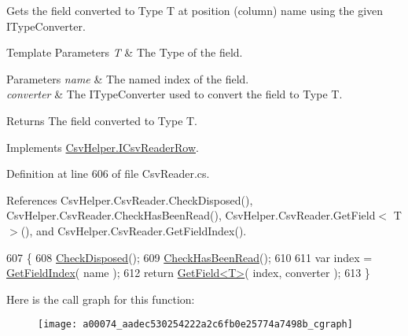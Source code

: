 Gets the field converted to Type T at position (column) name using the given I\-Type\-Converter. 


\begin{DoxyTemplParams}{Template Parameters}
{\em T} & The Type of the field.\\
\hline
\end{DoxyTemplParams}

\begin{DoxyParams}{Parameters}
{\em name} & The named index of the field.\\
\hline
{\em converter} & The I\-Type\-Converter used to convert the field to Type T.\\
\hline
\end{DoxyParams}
\begin{DoxyReturn}{Returns}
The field converted to Type T.
\end{DoxyReturn}


Implements \hyperlink{a00110_a640689c76826aafd8c79ff71d4f0992d}{Csv\-Helper.\-I\-Csv\-Reader\-Row}.



Definition at line 606 of file Csv\-Reader.\-cs.



References Csv\-Helper.\-Csv\-Reader.\-Check\-Disposed(), Csv\-Helper.\-Csv\-Reader.\-Check\-Has\-Been\-Read(), Csv\-Helper.\-Csv\-Reader.\-Get\-Field$<$ T $>$(), and Csv\-Helper.\-Csv\-Reader.\-Get\-Field\-Index().


\begin{DoxyCode}
607         \{
608             \hyperlink{a00074_a6fa45a46ed1322dc1872ca2321b5edbc}{CheckDisposed}();
609             \hyperlink{a00074_a2d9249171ed1568e45d152766d364c31}{CheckHasBeenRead}();
610 
611             var index = \hyperlink{a00074_a7e507d40e35fde7bf23e208be7be0884}{GetFieldIndex}( name );
612             \textcolor{keywordflow}{return} \hyperlink{a00074_a6a43cfaf39caea93ecd87e506be7b404}{GetField<T>}( index, converter );
613         \}
\end{DoxyCode}


Here is the call graph for this function\-:
\nopagebreak
\begin{figure}[H]
\begin{center}
\leavevmode
\texttt{[image: a00074\_aadec530254222a2c6fb0e25774a7498b\_cgraph]}
\end{center}
\end{figure}


